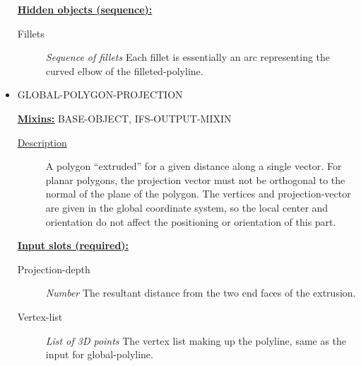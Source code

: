 \documentclass [11pt]{book}
\begin{document}
\begin{itemize}
\begin{description}
\end{description}






\textbf{
\underline{Hidden objects (sequence):}}

\begin{description}

\item [Fillets]
\emph{Sequence of fillets} Each fillet is essentially an arc representing the curved elbow
of the filleted-polyline.


\end{description}







\item {}GLOBAL-POLYGON-PROJECTION


\textbf{
\underline{Mixins:}} BASE-OBJECT, IFS-OUTPUT-MIXIN





\begin{description}

\item [
\underline{Description}]


A polygon ``extruded'' for a given distance along a single vector.
For planar polygons, the projection vector must not be orthogonal to the normal of the plane of
the polygon. The vertices and projection-vector are given in the global coordinate system, so
the local center and orientation do not affect the positioning or orientation of this part.



\end{description}








\textbf{
\underline{Input slots (required):}}

\begin{description}

\item [Projection-depth]
\emph{Number} The resultant distance from the two end faces of the extrusion.


\item [Vertex-list]
\emph{List of 3D points} The vertex list making up the polyline, same as the input for global-polyline.



\end{description}
\end{itemize}
\end{document}
